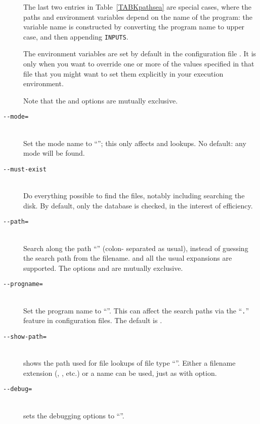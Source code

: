 \documentclass{article}
\begin{document}
\begin{multicols}{2}

\begin{description}
\item[] The last two entries in Table~\ref{TABKpathsea} are special
  cases, where the paths and environment variables depend on the name
  of the program: the variable name is constructed by converting the
  program name to upper case, and then appending \texttt{INPUTS}.
  
  The environment variables are set by default in the configuration
  file . It is only when you want to override one or
  more of the values specified in that file that you might want to set
  them explicitly in your execution environment.

  Note that the  and  options are mutually
  exclusive.
\item[\texttt{-{}-mode=}]\mbox{}\\
  Set the mode name to ``\texttt{}''; this only affects 
  and  lookups.  No default: any mode will be found.
\item[\texttt{-{}-must-exist}]\mbox{}\\
  Do everything possible to find the files, notably including
  searching the disk.  By default, only the  database is
  checked, in the interest of efficiency.
\item[\texttt{-{}-path=}]\mbox{}\\
  Search along the path ``\texttt{}'' (colon-%
  separated as usual),
  instead of guessing the search path from the filename.  \samp{//}
  and all the usual expansions are supported.
  The options  and  are mutually
  exclusive.
\item[\texttt{-{}-progname=}]\mbox{}\\
  Set the program name to ``\texttt{}''.
  This can affect the search paths via the ``\texttt{.}''
  feature in configuration files.
  The default is .
\item[\texttt{-{}-show-path=}]\mbox{}\\
  shows the path used for file lookups of file type ``\texttt{}''.
  Either a filename extension (, , etc.) or a
  name can be used, just as with  option.
\item[\texttt{-{}-debug=}]\mbox{}\\
  sets the debugging options to ``\texttt{}''.
\end{description}



\end{multicols}
\end{document}
